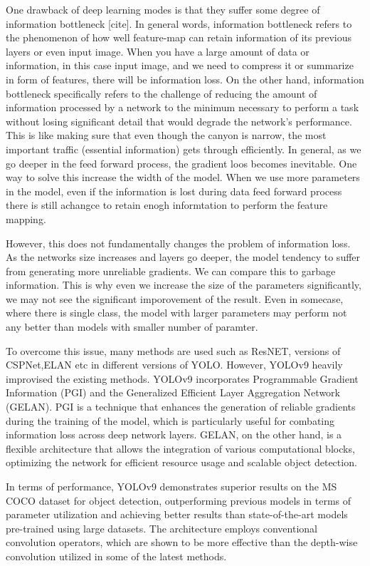 One  drawback of deep learning modes is that they suffer some degree of information bottleneck [cite]. In general words, information bottleneck refers to the phenomenon of how well feature-map can retain information of its previous layers or even input image. When you have a large amount of data or information, in this case input image, and we need to compress it or summarize in form of features, there will be information loss. On the other hand, information bottleneck specifically refers to the challenge of reducing the amount of information processed by a network to the minimum necessary to perform a task without losing significant detail that would degrade the network's performance. This is like making sure that even though the canyon is narrow, the most important traffic (essential information) gets through efficiently. In general, as we go deeper in the feed forward process, the gradient loos becomes inevitable. One way to solve this increase the width of the model. When we use more parameters in the model, even if the information is lost during data feed forward process there is still achangce to retain enogh informtation to perform the feature mapping. 

However, this does not fundamentally changes the problem of information loss. As the networks size increases and layers go deeper, the model tendency to suffer from generating more unreliable gradients. We can compare this to garbage information. This is why even we increase the size of the parameters significantly, we may not see the significant imporovement of the result. Even in somecase, where there is single class, the model with larger parameters may perform not any better than models with smaller number of paramter.

To overcome this issue, many methods are used such as ResNET, versions of CSPNet,ELAN etc in different versions of YOLO. However, YOLOv9 \cite{wang2024yolov9} heavily improvised the existing methods. YOLOv9 incorporates Programmable Gradient Information (PGI) and the Generalized Efficient Layer Aggregation Network (GELAN). PGI is a technique that enhances the generation of reliable gradients during the training of the model, which is particularly useful for combating information loss across deep network layers. GELAN, on the other hand, is a flexible architecture that allows the integration of various computational blocks, optimizing the network for efficient resource usage and scalable object detection.


In terms of performance, YOLOv9 demonstrates superior results on the MS COCO dataset for object detection, outperforming previous models in terms of parameter utilization and achieving better results than state-of-the-art models pre-trained using large datasets. The architecture employs conventional convolution operators, which are shown to be more effective than the depth-wise convolution utilized in some of the latest methods.


